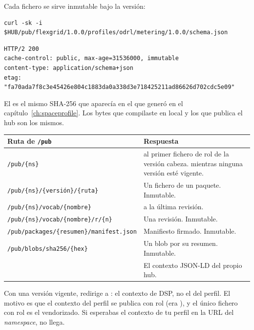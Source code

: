 Cada fichero se sirve inmutable bajo la versión:

\begin{lstlisting}[style=sh]
curl -sk -i $HUB/pub/flexgrid/1.0.0/profiles/odrl/metering/1.0.0/schema.json
\end{lstlisting}
\begin{lstlisting}[style=out]
HTTP/2 200
cache-control: public, max-age=31536000, immutable
content-type: application/schema+json
etag: "fa70ada7f8c3e45426e804c1883da0a338d3e718425211ad86626d702cdc5e09"
\end{lstlisting}

El  es el mismo SHA-256 que aparecía en el  que generó  en el
capítulo~\ref{ch:spaceprofile}. Los bytes que compilaste en local y los que publica el hub son los mismos.

\noindent\begin{tabularx}{\linewidth}{@{}L{6.4cm}Y@{}}
\toprule
\textbf{Ruta de \texttt{/\allowbreak{}pub}} & \textbf{Respuesta} \\
\midrule
\texttt{/\allowbreak{}pub/\allowbreak{}\{ns\}} &  al primer fichero de rol  de la versión cabeza.  mientras ninguna versión esté vigente. \\
\texttt{/\allowbreak{}pub/\allowbreak{}\{ns\}/\allowbreak{}\{versión\}/\allowbreak{}\{ruta\}} & Un fichero de un paquete. Inmutable. \\
\texttt{/\allowbreak{}pub/\allowbreak{}\{ns\}/\allowbreak{}vocab/\allowbreak{}\{nombre\}} &  a la última revisión. \\
\texttt{/\allowbreak{}pub/\allowbreak{}\{ns\}/\allowbreak{}vocab/\allowbreak{}\{nombre\}/\allowbreak{}r/\allowbreak{}\{n\}} & Una revisión. Inmutable. \\
\texttt{/\allowbreak{}pub/\allowbreak{}packages/\allowbreak{}\{resumen\}/\allowbreak{}manifest.json} & Manifiesto firmado. Inmutable. \\
\texttt{/\allowbreak{}pub/\allowbreak{}blobs/\allowbreak{}sha256/\allowbreak{}\{hex\}} & Un blob por su resumen. Inmutable. \\
 & El contexto JSON-LD del propio hub. \\
\bottomrule
\end{tabularx}

\begin{trampaHabitual}
Con una versión vigente,  redirige a
: el contexto de DSP, no el del perfil. El
motivo es que el contexto del perfil se publica con rol  (era ), y el único fichero con
rol  es el vendorizado. Si esperabas el contexto de tu perfil en la URL del \emph{namespace}, no
llega.
\end{trampaHabitual}

